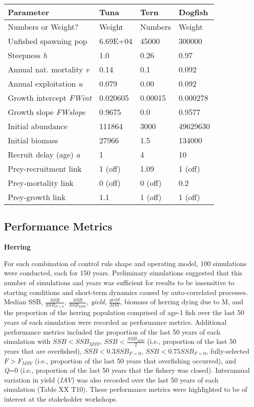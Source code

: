\documentclass[]{article}
\begin{document}
\begin{longtable}[]{@{}llll@{}}
\toprule
Parameter & Tuna & Tern & Dogfish\tabularnewline
\midrule
\endhead
Numbers or Weight? & Weight & Numbers & Weight\tabularnewline
Unfished spawning pop & 6.69E+04 & 45000 & 300000\tabularnewline
Steepness \emph{h} & 1.0 & 0.26 & 0.97\tabularnewline
Annual nat. mortality \emph{v} & 0.14 & 0.1 & 0.092\tabularnewline
Annual exploitation \emph{u} & 0.079 & 0.00 & 0.092\tabularnewline
Growth intercept \emph{FWint} & 0.020605 & 0.00015 &
0.000278\tabularnewline
Growth slope \emph{FWslope } & 0.9675 & 0.0 & 0.9577\tabularnewline
Initial abundance & 111864 & 3000 & 49629630\tabularnewline
Initial biomass & 27966 & 1.5 & 134000\tabularnewline
Recruit delay (age) \emph{a} & 1 & 4 & 10\tabularnewline
Prey-recruitment link & 1 (off) & 1.09 & 1 (off)\tabularnewline
Prey-mortality link & 0 (off) & 0 (off) & 0.2\tabularnewline
Prey-growth link & 1.1 & 1 (off) & 1 (off)\tabularnewline
\bottomrule
\end{longtable}

\subsection{\texorpdfstring{\textbf{Performance
Metrics}}{Performance Metrics}}\label{performance-metrics}

\textbf{Herring}

For each combination of control rule shape and operating model, 100
simulations were conducted, each for 150 years. Preliminary simulations
suggested that this number of simulations and years was sufficient for
results to be insensitive to starting conditions and short-term dynamics
caused by auto-correlated processes. Median SSB,
\(\frac{SSB}{SSB_{F=0}}\), \(\frac{SSB}{SSB_{MSY}}\), \emph{yield},
\(\frac{yield}{MSY}\), biomass of herring dying due to M, and the
proportion of the herring population comprised of age-1 fish over the
last 50 years of each simulation were recorded as performance metrics.
Additional performance metrics included the proportion of the last 50
years of each simulation with \(SSB < SSB_{MSY}\),
\(SSB < \frac{SSB_{MSY}}{2}\) (i.e., proportion of the last 50 years
that are overfished), \(SSB < 0.3SSB_{F=0}\), \(SSB < 0.75SSB_{F=0}\),
fully-selected \(F > F_{MSY}\) (i.e., proportion of the last 50 years
that overfishing occurred), and \emph{Q}=0 (i.e., proportion of the last
50 years that the fishery was closed). Interannual variation in yield
(\emph{IAV}) was also recorded over the last 50 years of each simulation
(Table XX T10). These performance metrics were highlighted to be of
interest at the stakeholder workshops.
\end{document}
